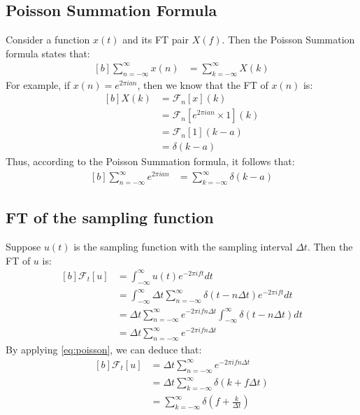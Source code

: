 \documentclass[letterpaper, 11pt]{article}
\newcommand{\fint}{\int_{-\infty}^{\infty}} %
\newcommand{\fsum}[1]{\sum_{#1 = -\infty}^{\infty}} %
\newcommand{\spf}[2]{\Delta #1 \fsum{#2} \delta (#1 - #2 \Delta #1)} %
\newcommand{\fourier}[2]{\mathcal{F}_{#1}[#2]} %
\newcommand{\ft}[3]{\fint #2 e^{-2\pi i#3#1} d#1} %
\numberwithin{equation}{section}
\numberwithin{figure}{section}
\numberwithin{table}{section}
\begin{document}
\subsection{Poisson Summation Formula}
Consider a function \(x(t)\) and its FT pair \(X(f)\). Then the Poisson Summation formula states that:
\begin{equation}
	\begin{aligned}[b]
		\fsum{n} x(n)	&= \fsum{k} X(k)
	\end{aligned}
\end{equation}
For example, if \(x(n) = e^{2 \pi ian}\), then we know that the FT of \(x(n)\) is:
\begin{equation}
	\begin{aligned}[b]
		X(k)	&= \fourier{n}{x}(k) \\
			&= \fourier{n}{e^{2 \pi ian} \times 1}(k) \\
			&= \fourier{n}{1}(k - a) \\
			&= \delta (k - a)
	\end{aligned}
\end{equation}
Thus, according to the Poisson Summation formula, it follows that:
\begin{equation}
	\begin{aligned}[b]
		\fsum{n} e^{2 \pi ian}
			&= \fsum{k} \delta (k - a)
			\label{eq:poisson}
	\end{aligned}
\end{equation}

\subsection{FT of the sampling function}
Suppose \(u(t)\) is the sampling function with the sampling interval \(\Delta t\). Then the FT of \(u\) is:
\begin{equation}
	\begin{aligned}[b]
		\fourier{t}{u}
			&= \ft{t}{u(t)}{f} \\
			&= \ft{t}{\spf{t}{n}}{f} \\
			&= \Delta t \fsum{n} e^{-2\pi ifn\Delta t} \fint \delta (t - n \Delta t) dt \\
			&= \Delta t \fsum{n} e^{-2\pi ifn\Delta t}
	\end{aligned}
\end{equation}
By applying \eqref{eq:poisson}, we can deduce that:
\begin{equation}
	\begin{aligned}[b]
		\fourier{t}{u}
			&= \Delta t \fsum{n} e^{-2\pi ifn\Delta t} \\
			&= \Delta t \fsum{k} \delta (k + f \Delta t)\\
			&= \fsum{k} \delta (f + \frac{k}{\Delta t})
	\end{aligned}
\end{equation}
\end{document}
